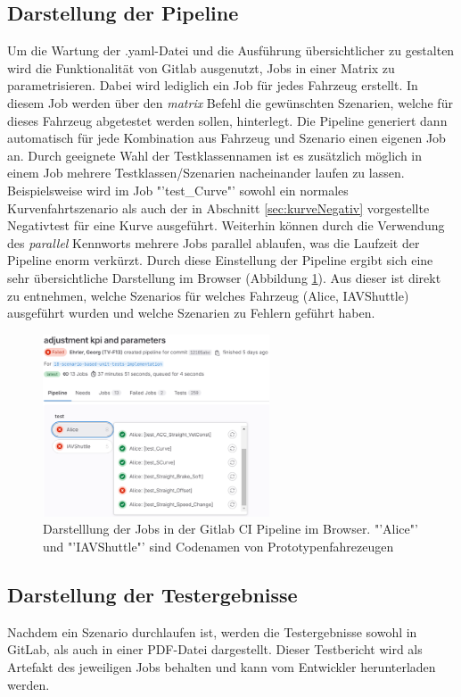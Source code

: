 \subsection{Darstellung der Pipeline}
Um die Wartung der .yaml-Datei und die Ausführung übersichtlicher zu gestalten wird die Funktionalität von Gitlab ausgenutzt, Jobs in einer Matrix zu parametrisieren. Dabei wird lediglich ein Job für jedes Fahrzeug erstellt. In diesem Job werden über den \textit{matrix} Befehl die gewünschten Szenarien, welche für dieses Fahrzeug abgetestet werden sollen, hinterlegt. Die Pipeline generiert dann automatisch für jede Kombination aus Fahrzeug und Szenario einen eigenen Job an. Durch geeignete Wahl der Testklassennamen ist es zusätzlich möglich in einem Job mehrere Testklassen/Szenarien nacheinander laufen zu lassen. Beispielsweise wird im Job "'test\_Curve"' sowohl ein normales Kurvenfahrtszenario als auch der in Abschnitt \ref{sec:kurveNegativ} vorgestellte Negativtest für eine Kurve ausgeführt. Weiterhin können durch die Verwendung des \textit{parallel} Kennworts mehrere Jobs parallel ablaufen, was die Laufzeit der Pipeline enorm verkürzt. Durch diese Einstellung der Pipeline ergibt sich eine sehr übersichtliche Darstellung im Browser (Abbildung \ref{fig:uebersicht_pipeline}). Aus dieser ist direkt zu entnehmen, welche Szenarios für welches Fahrzeug (Alice, IAVShuttle) ausgeführt wurden und welche Szenarien zu Fehlern geführt haben.
\begin{figure}[ht]
    \centering
    \includegraphics[width=0.6\textwidth]{figures/3_Implementierung/uebersicht_pipeline.png}
    \caption{Darstelllung der Jobs in der Gitlab CI Pipeline im Browser. "'Alice"' und "'IAVShuttle"' sind Codenamen von Prototypenfahrezeugen}
    \label{fig:uebersicht_pipeline}
\end{figure}

\subsection{Darstellung der Testergebnisse}
Nachdem ein Szenario durchlaufen ist, werden die Testergebnisse sowohl in GitLab, als auch in einer PDF-Datei dargestellt. Dieser Testbericht wird als Artefakt des jeweiligen Jobs behalten und kann vom Entwickler herunterladen werden.

